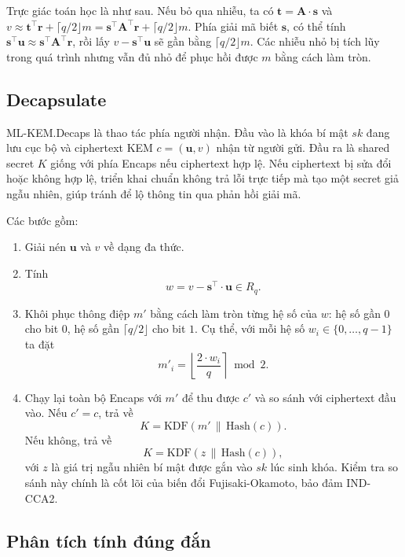 Trực giác toán học là như sau. Nếu bỏ qua nhiễu, ta có $\mathbf{t} = \mathbf{A} \cdot \mathbf{s}$ và $v \approx \mathbf{t}^{\top} \mathbf{r} + \lceil q/2 \rfloor m = \mathbf{s}^{\top} \mathbf{A}^{\top} \mathbf{r} + \lceil q/2 \rfloor m$. Phía giải mã biết $\mathbf{s}$, có thể tính $\mathbf{s}^{\top} \mathbf{u} \approx \mathbf{s}^{\top} \mathbf{A}^{\top} \mathbf{r}$, rồi lấy $v - \mathbf{s}^{\top} \mathbf{u}$ sẽ gần bằng $\lceil q/2 \rfloor m$. Các nhiễu nhỏ bị tích lũy trong quá trình nhưng vẫn đủ nhỏ để phục hồi được $m$ bằng cách làm tròn.

\subsection{Decapsulate}

ML-KEM.Decaps là thao tác phía người nhận. Đầu vào là khóa bí mật $sk$ đang lưu cục bộ và ciphertext KEM $c = (\mathbf{u}, v)$ nhận từ người gửi. Đầu ra là shared secret $K$ giống với phía Encaps nếu ciphertext hợp lệ. Nếu ciphertext bị sửa đổi hoặc không hợp lệ, triển khai chuẩn không trả lỗi trực tiếp mà tạo một secret giả ngẫu nhiên, giúp tránh để lộ thông tin qua phản hồi giải mã.

Các bước gồm:

\begin{enumerate}
    \item Giải nén $\mathbf{u}$ và $v$ về dạng đa thức.
    \item Tính
    \[
    w = v - \mathbf{s}^{\top} \cdot \mathbf{u} \in R_q.
    \]
    \item Khôi phục thông điệp $m'$ bằng cách làm tròn từng hệ số của $w$: hệ số gần $0$ cho bit $0$, hệ số gần $\lceil q/2 \rfloor$ cho bit $1$. Cụ thể, với mỗi hệ số $w_i \in \{0, \ldots, q-1\}$ ta đặt
    \[
    m'_i = \left\lfloor \frac{2 \cdot w_i}{q} \right\rceil \bmod 2.
    \]
    \item Chạy lại toàn bộ Encaps với $m'$ để thu được $c'$ và so sánh với ciphertext đầu vào. Nếu $c' = c$, trả về
    \[
    K = \text{KDF}(m' \,\|\, \text{Hash}(c)).
    \]
    Nếu không, trả về
    \[
    K = \text{KDF}(z \,\|\, \text{Hash}(c)),
    \]
    với $z$ là giá trị ngẫu nhiên bí mật được gắn vào $sk$ lúc sinh khóa. Kiểm tra so sánh này chính là cốt lõi của biến đổi Fujisaki-Okamoto, bảo đảm IND-CCA2.
\end{enumerate}

\subsection{Phân tích tính đúng đắn}

